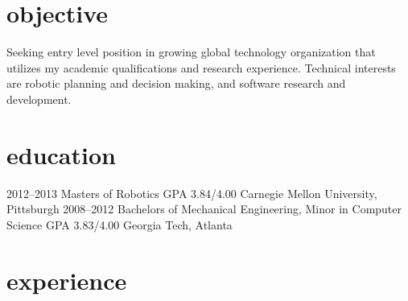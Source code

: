 \documentclass[]{friggeri-cv} %
\begin{document}
\section{objective}
Seeking entry level position in growing global technology organization that utilizes my academic qualifications and research experience. Technical interests are robotic planning and decision making, and software research and development.


\section{education}

\begin{entrylist}
\eduentry
{2012--2013}
{Masters {\normalfont of Robotics}}
{GPA 3.84/4.00}
{Carnegie Mellon University, Pittsburgh}
\eduentry
{2008--2012}
{Bachelors {\normalfont of Mechanical Engineering, Minor in Computer Science}}
{GPA 3.83/4.00}
{Georgia Tech, Atlanta}
\end{entrylist}

\vspace{-2mm}
\section{experience}
\end{document}
